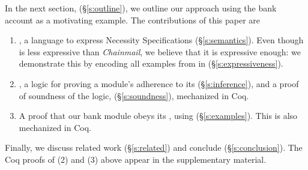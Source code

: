 In the next section, (\S\ref{s:outline}),  we outline our approach using the
bank account as  a motivating example. 
%
The contributions of this paper are\begin{enumerate}
 \item
\Chainspec, a language to
express Necessity Specifications (\S\ref{s:semantics}). Even though \Chainspec is
less expressive than  \emph{Chainmail}, we believe that it is expressive enough: we demonstrate this
by encoding all examples from \cite{FASE} in \Chainspec (\S\ref{s:expressiveness}). 
 \item
\Chainlogic, a logic for proving a module's adherence to its
 \NecessitySpecifications (\S\ref{s:inference}), and a proof of soundness of the logic, (\S\ref{s:soundness}),
 mechanized in Coq. 
 \item
A    proof that %
  our bank module obeys its \NecessitySpecification, using   \Chainlogic  (\S\ref{s:examples}). This is also mechanized in Coq.
\end{enumerate}
 
 
 


\noindent Finally, we discuss %
 related work (\S\ref{s:related}) and conclude (\S\ref{s:conclusion}).
The Coq proofs of 
(2) and (3) above %
appear in the
supplementary material.










